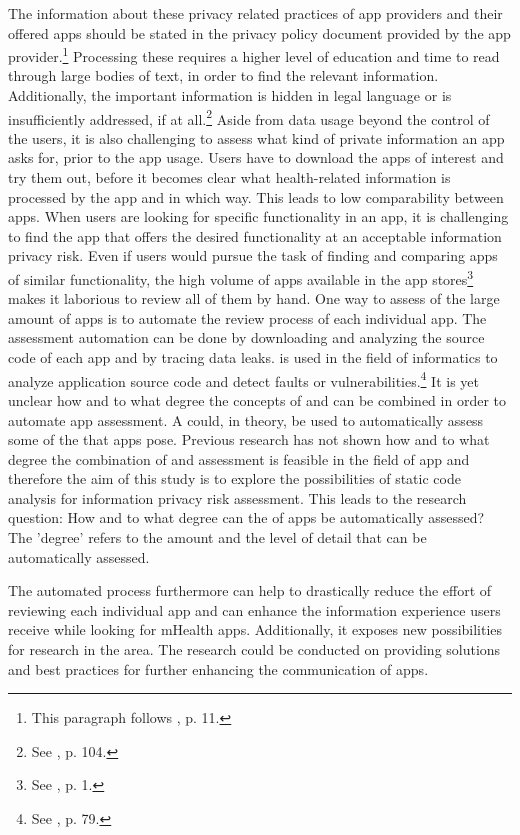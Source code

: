 The information about these privacy related practices of app providers and their offered apps should be stated in the privacy policy document provided by the app provider.\footnote{This paragraph follows \cite{Dehling2014}, p. 11.}
Processing these \pps requires a higher level of education and time to read through large bodies of text, in order to find the relevant information. 
Additionally, the important information is hidden in legal language or is  insufficiently addressed, if at all.\footnote{See \cite{Pollach2007}, p. 104.}
Aside from data usage beyond the control of the users, it is also challenging to assess what kind of private information an app asks for, prior to the app usage. 
Users have to download the apps of interest and try them out, before it becomes clear what health-related information is processed by the app and in which  way. 
This leads to low comparability between apps. 
When users are looking for specific functionality in an \mH app, it is challenging to find the app that offers the desired functionality at an acceptable information privacy risk. 
Even if users would pursue the task of finding and comparing \mH apps of similar functionality, the high volume of apps available in the app stores\footnote{See \cite{Enck2011}, p. 1.} makes it laborious to review all of them by hand.
One way to assess \ipr of the large amount of \mH apps is to automate the review process of each individual app. 
The assessment automation can be done by downloading and analyzing the source code of each app and by tracing data leaks. 
\Sca is used in the field of informatics to analyze application source code and detect faults or vulnerabilities.\footnote{See \cite{Baca2008}, p. 79.} 
It is yet unclear how and to what degree the concepts of \sca and \pra can be combined in order to automate app assessment.
A \sca could, in theory, be used to automatically assess some of the \ipr that \mH apps pose.
Previous research has not shown how and to what degree the combination of \sca and \ipr assessment is feasible in the field of \mH app \pra and therefore the aim of this study is to explore the possibilities of static code analysis for information privacy risk assessment. 
This leads to the research question: How and to what degree can the \ipr of \mH apps be automatically assessed?
The 'degree' refers to the amount and the level of detail that \iprfs can be automatically assessed.

The automated process furthermore can help to drastically reduce the effort of reviewing each individual app and can enhance the information experience users receive while looking for mHealth apps.
Additionally, it exposes new possibilities for research in the \ipr area. 
The research could be conducted on providing solutions and best practices for further enhancing the \ipr communication of apps.

